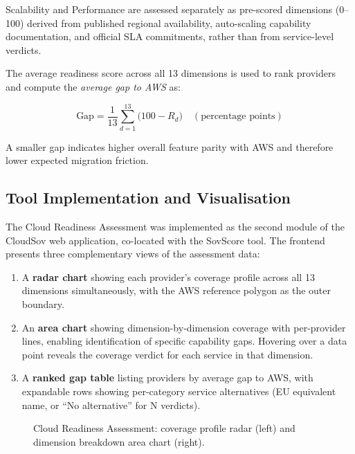 Scalability and Performance are assessed separately as pre-scored dimensions (0--100) derived from published regional availability, auto-scaling capability documentation, and official SLA commitments, rather than from service-level verdicts.

The average readiness score across all 13 dimensions is used to rank providers and compute the \textit{average gap to AWS} as:

\begin{equation}
  \text{Gap} = \frac{1}{13} \sum_{d=1}^{13} \bigl(100 - R_d\bigr) \quad (\text{percentage points})
  \label{eq:readiness_gap}
\end{equation}

A smaller gap indicates higher overall feature parity with AWS and therefore lower expected migration friction.

\subsection{Tool Implementation and Visualisation}
\label{subsec:readiness_implementation}

The Cloud Readiness Assessment was implemented as the second module of the CloudSov web application, co-located with the SovScore tool. The frontend presents three complementary views of the assessment data:

\begin{enumerate}
  \item A \textbf{radar chart} showing each provider's coverage profile across all 13 dimensions simultaneously, with the AWS reference polygon as the outer boundary.
  \item An \textbf{area chart} showing dimension-by-dimension coverage with per-provider lines, enabling identification of specific capability gaps. Hovering over a data point reveals the coverage verdict for each service in that dimension.
  \item A \textbf{ranked gap table} listing providers by average gap to AWS, with expandable rows showing per-category service alternatives (EU equivalent name, or ``No alternative'' for N verdicts).
\end{enumerate}

\begin{figure}[htbp]
  \centering
  \caption{Cloud Readiness Assessment: coverage profile radar (left) and dimension breakdown area chart (right).}
  \label{fig:readiness_charts}
\end{figure}

